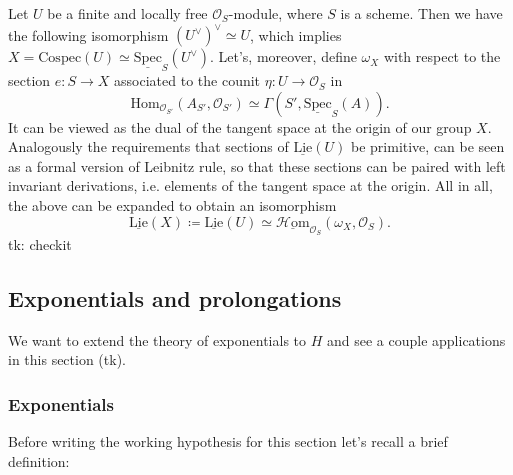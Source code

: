 \documentclass[../Main]{subfiles}
\begin{document}
\begin{rem}
	Let $U$ be a finite and locally free $\mathcal{O}_{ S }$-module,
	where $S$ is a scheme.
	Then we have the following isomorphism $(U^\vee)^\vee \simeq U$,
	which implies $X = \mathrm{Cospec}(U) \simeq 
	\underline{\mathrm{Spec}}_S(U^\vee)$.
	Let's, moreover, define $\omega_X$ with respect to the section $e\colon S \to X$
	associated to the counit $\eta\colon U \to \mathcal{O}_{ S }$ in
	\begin{equation*}
		\mathrm{Hom}_{ \mathcal{O}_{ S' }}
		\left( A_{S'}, \mathcal{O}_{ S' } \right) 
		\simeq
		\Gamma(S', \underline{\mathrm{Spec}}_S(A))
	.\end{equation*}
	It can be viewed as the dual of the tangent space at the origin
	of our group $X$.
	Analogously the requirements that sections of $\underline{\mathrm{Lie}}(U)$
	be primitive, can be seen as a formal version of Leibnitz rule,
	so that these sections can be paired with left invariant derivations, i.e.
	elements of the tangent space at the origin.
	All in all, the above can be expanded to obtain an isomorphism
	\begin{equation*}
		\underline{\mathrm{Lie}}(X) \coloneqq
		\underline{\mathrm{Lie}}(U) \simeq
		\underline{\mathcal{H}\mathrm{om}}_{ \mathcal{O}_{ S } } 
		\left(\omega_X , \mathcal{O}_{ S } \right)
	.\end{equation*}
	tk: checkit
\end{rem}


\subsection{Exponentials and prolongations}
We want to extend the theory of exponentials to $H$ and 
see a couple applications in this section (tk).




\subsubsection{Exponentials}
Before writing the working hypothesis for this section
let's recall a brief definition:
\end{document}
